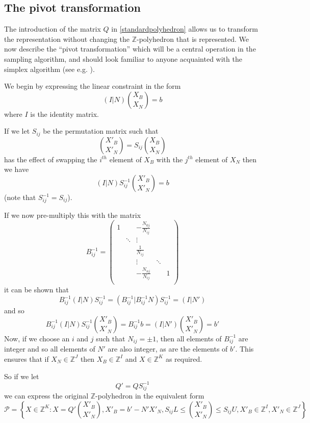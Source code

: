 \documentclass{article}
\begin{document}
\subsection{The pivot transformation}

The introduction of the matrix $Q$ in \eqref{standardpolyhedron} allows us to transform the representation without changing the $\mathbb{Z}$-polyhedron that is represented. We now describe the ``pivot transformation'' which will be a central operation in the sampling algorithm, and should look familiar to anyone acquainted with the simplex algorithm (see e.g. \cite{vanderbei2015linear}).

We begin by expressing the linear constraint in the form
\[
(I|N){X_B \choose X_N} = b
\]
where $I$ is the identity matrix.

If we let $S_{ij}$ be the permutation matrix such that
\[
{X'_B\choose X'_N} = S_{ij}{X_B\choose X_N}
\]
has the effect of swapping the $i^{th}$ element of $X_B$ with the $j^{th}$ element of $X_N$ then we have
\[
(I|N)S^{-1}_{ij}{X'_B \choose X'_N} = b
\]
(note that $S^{-1}_{ij} = S_{ij}$).

If we now pre-multiply this with the matrix 
\[
B_{ij}^{-1} =  
\begin{pmatrix}
1 &  & -\frac{N_{0j}}{N_{ij}} & & \\
  & \ddots & \vdots & &\\
 & & \frac{1}{N_{ij}} & &\\
  & & \vdots & \ddots &\\
  & & -\frac{N_{nj}}{N_{ij}} & &1\\
\end{pmatrix}
\]
it can be shown \cite{maros2002computational} that
\begin{equation}
B_{ij}^{-1}(I|N)S^{-1}_{ij} = (B_{ij}^{-1}|B_{ij}^{-1}N)S^{-1}_{ij} = (I|N')
\label{Ntransform}
\end{equation}
and so
\begin{equation}
B_{ij}^{-1}(I|N)S^{-1}_{ij}{X'_B \choose X'_N} = B_{ij}^{-1}b  = (I|N'){X'_B \choose X'_N} = b'
\end{equation}
Now, if we choose an $i$ and $j$ such that $N_{ij} = \pm 1$, then all elements of $B^{-1}_{ij}$ are integer and so all elements of $N'$ are also integer, as are the elements of $b'$. This ensures that if $X_N\in\mathbb{Z}^J$ then $X_B\in\mathbb{Z}^I$ and $X\in\mathbb{Z}^K$ as required.

So if we let
\[
Q' = QS^{-1}_{ij}
\]
we can express the original $\mathbb{Z}$-polyhedron in the equivalent form
\begin{equation}
\mathcal{P} = \left\{X\in\mathbb{Z}^K: X = Q'{X'_B\choose X'_N}, X'_B = b'-N'X'_N, S_{ij}L \le {X'_B \choose X'_N} \le S_{ij}U, X'_B \in \mathbb{Z}^I, X'_N \in \mathbb{Z}^J \right\}
\end{equation}
\end{document}
